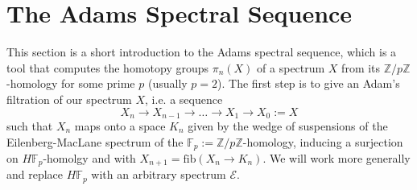 \newpage
\section{The Adams Spectral Sequence}
This section is a short introduction to the Adams spectral sequence, which is a tool that computes the homotopy groups $\pi_n(X)$ of a spectrum $X$ from its $\mathbb{Z}/p\mathbb{Z}$-homology for some prime $p$ (usually $p=2$). The first step is to give an Adam's filtration of our spectrum $X$, i.e. a sequence 
	\[
	X_n \to X_{n-1} \to \dots \to X_1 \to X_0 := X
	\]
	such that $X_n$ maps onto a space $K_n$ given by the wedge of suspensions of the Eilenberg-MacLane spectrum of the $\mathbb{F}_p := \mathbb{Z}/p\mathbb{Z}$-homology, inducing a surjection on $H\mathbb{F}_p$-homolgy and with $X_{n+1} = \text{fib}(X_n \to K_n)$. We will work more generally and replace $H\mathbb{F}_p$ with an arbitrary spectrum $\mathcal{E}$.





